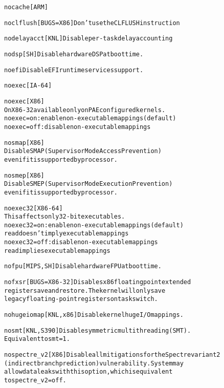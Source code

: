 \documentclass[a4paper,8pt,english]{sphinxmanual}
\begin{document}
\begin{alltt}
        nocache         {[}ARM{]}

        noclflush       {[}BUGS=X86{]} Don't use the CLFLUSH instruction

        nodelayacct     {[}KNL{]} Disable per-task delay accounting

        nodsp           {[}SH{]} Disable hardware DSP at boot time.

        noefi           Disable EFI runtime services support.

        noexec          {[}IA-64{]}

        noexec          {[}X86{]}
                        On X86-32 available only on PAE configured kernels.
                        noexec=on: enable non-executable mappings (default)
                        noexec=off: disable non-executable mappings

        nosmap          {[}X86{]}
                        Disable SMAP (Supervisor Mode Access Prevention)
                        even if it is supported by processor.

        nosmep          {[}X86{]}
                        Disable SMEP (Supervisor Mode Execution Prevention)
                        even if it is supported by processor.

        noexec32        {[}X86-64{]}
                        This affects only 32-bit executables.
                        noexec32=on: enable non-executable mappings (default)
                                read doesn't imply executable mappings
                        noexec32=off: disable non-executable mappings
                                read implies executable mappings

        nofpu           {[}MIPS,SH{]} Disable hardware FPU at boot time.

        nofxsr          {[}BUGS=X86-32{]} Disables x86 floating point extended
                        register save and restore. The kernel will only save
                        legacy floating-point registers on task switch.

        nohugeiomap     {[}KNL,x86{]} Disable kernel huge I/O mappings.

        nosmt           {[}KNL,S390{]} Disable symmetric multithreading (SMT).
                        Equivalent to smt=1.

        nospectre\_v2    {[}X86{]} Disable all mitigations for the Spectre variant 2
                        (indirect branch prediction) vulnerability. System may
                        allow data leaks with this option, which is equivalent
                        to spectre\_v2=off.


\end{alltt}
\end{document}
